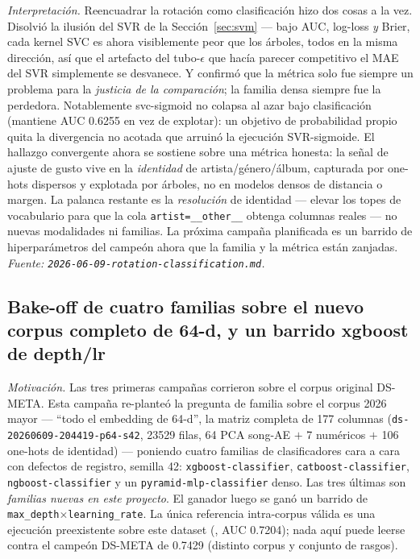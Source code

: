 \documentclass[11pt]{article}
\newcommand{\runid}[1]{\texttt{\small\seqsplit{#1}}}
\newcommand{\dsid}[1]{\texttt{\small #1}}
\begin{document}
\emph{Interpretación.} Reencuadrar la rotación como clasificación hizo dos cosas a
la vez. Disolvió la ilusión del SVR de la Sección~\ref{sec:svm} --- bajo AUC,
log-loss \emph{y} Brier, cada kernel SVC es ahora visiblemente peor que los
árboles, todos en la misma dirección, así que el artefacto del tubo-$\epsilon$
que hacía parecer competitivo el MAE del SVR simplemente se desvanece. Y confirmó
que la métrica solo fue siempre un problema para la \emph{justicia de la
comparación}; la familia densa siempre fue la perdedora. Notablemente svc-sigmoid
no colapsa al azar bajo clasificación (mantiene AUC 0.6255 en vez de explotar):
un objetivo de probabilidad propio quita la divergencia no acotada que arruinó la
ejecución SVR-sigmoide. El hallazgo convergente ahora se sostiene sobre una
métrica honesta: la señal de ajuste de gusto vive en la \emph{identidad} de
artista/género/álbum, capturada por one-hots dispersos y explotada por árboles,
no en modelos densos de distancia o margen. La palanca restante es la
\emph{resolución} de identidad --- elevar los topes de vocabulario para que la
cola \texttt{artist=\_\_other\_\_} obtenga columnas reales --- no nuevas
modalidades ni familias. La próxima campaña planificada es un barrido de
hiperparámetros del campeón ahora que la familia y la métrica están zanjadas.
\emph{Fuente: \texttt{2026-06-09-rotation-classification.md}.}

\subsection{Bake-off de cuatro familias sobre el nuevo corpus completo de 64-d, y un barrido xgboost de depth/lr}
\label{sec:bakeoff-p64}
\emph{Motivación.} Las tres primeras campañas corrieron sobre el corpus original
DS-META. Esta campaña re-planteó la pregunta de familia sobre el corpus 2026
mayor --- ``todo el embedding de 64-d'', la matriz completa de 177 columnas
(\dsid{ds-20260609-204419-p64-s42}, \num{23529} filas, 64 PCA song-AE $+$ 7
numéricos $+$ 106 one-hots de identidad) --- poniendo cuatro familias de
clasificadores cara a cara con defectos de registro, semilla 42:
\texttt{xgboost-classifier}, \texttt{catboost-classifier},
\texttt{ngboost-classifier} y un \texttt{pyramid-mlp-classifier} denso. Las tres
últimas son \emph{familias nuevas en este proyecto}. El ganador luego se ganó un
barrido de \texttt{max\_depth}$\times$\texttt{learning\_rate}. La única referencia
intra-corpus válida es una ejecución preexistente sobre este dataset
(\runid{run-20260609-204726-439d8-xgboost-classifier}, AUC \num{0.7204}); nada
aquí puede leerse contra el campeón DS-META de \num{0.7429} (distinto corpus y
conjunto de rasgos).
\end{document}
